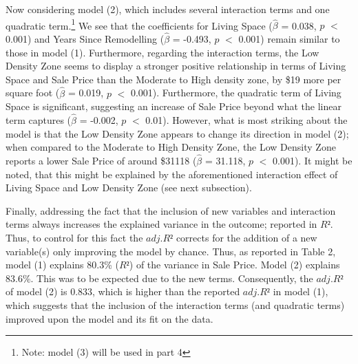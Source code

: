 \documentclass[a4paper]{article}
\begin{document}
\indent Now considering model (2), which includes several interaction terms and one quadratic term.\footnote{Note: model (3) will be used in part 4} We see that the coefficients for Living Space ($\hat{\beta}$ = 0.038, $p$ $<$ 0.001) and Years Since Remodelling ($\hat{\beta}$ = -0.493, $p$ $<$ 0.001) remain similar to those in model (1). Furthermore, regarding the interaction terms, the Low Density Zone seems to display a stronger positive relationship in terms of Living Space and Sale Price than the Moderate to High density zone, by \$19 more per square foot ($\hat{\beta}$ = 0.019, $p$ $<$ 0.001). Furthermore, the quadratic term of Living Space is significant, suggesting an increase of Sale Price beyond what the linear term captures ($\hat{\beta}$ = -0.002, $p$ $<$ 0.01). However, what is most striking about the model is that the Low Density Zone appears to change its direction in model (2); when compared to the Moderate to High Density Zone, the Low Density Zone reports a lower Sale Price of around \$31118 ($\hat{\beta}$ = 31.118, $p$ $<$ 0.001). It might be noted, that this might be explained by the aforementioned interaction effect of Living Space and Low Density Zone (see next subsection).

Finally, addressing the fact that the inclusion of new variables and interaction terms always increases the explained variance in the outcome; reported in $R²$. Thus, to control for this fact the $adj.R²$ corrects for the addition of a new variable(s) only improving the model by chance.
Thus, as reported in Table 2, model (1) explains 80.3\% ($R²$) of the variance in Sale Price. Model (2) explains 83.6\%. This was to be expected due to the new terms. Consequently, the $adj.R²$ of model (2) is 0.833, which is higher than the reported $adj.R²$ in model (1), which suggests that the inclusion of the interaction terms (and quadratic terms) improved upon the model and its fit on the data. 
\end{document}
